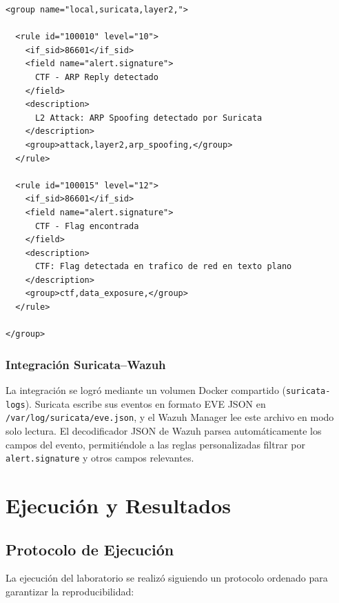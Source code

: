 \documentclass[12pt, a4paper]{article}
\begin{document}
\begin{lstlisting}[style=rulestyle, caption={Ejemplo de regla personalizada de Wazuh}]
<group name="local,suricata,layer2,">

  <rule id="100010" level="10">
    <if_sid>86601</if_sid>
    <field name="alert.signature">
      CTF - ARP Reply detectado
    </field>
    <description>
      L2 Attack: ARP Spoofing detectado por Suricata
    </description>
    <group>attack,layer2,arp_spoofing,</group>
  </rule>

  <rule id="100015" level="12">
    <if_sid>86601</if_sid>
    <field name="alert.signature">
      CTF - Flag encontrada
    </field>
    <description>
      CTF: Flag detectada en trafico de red en texto plano
    </description>
    <group>ctf,data_exposure,</group>
  </rule>

</group>
\end{lstlisting}

\subsubsection{Integraci\'on Suricata--Wazuh}

La integraci\'on se logr\'o mediante un volumen Docker compartido (\texttt{suricata-logs}). Suricata escribe sus eventos en formato EVE JSON en \texttt{/var/log/suricata/eve.json}, y el Wazuh Manager lee este archivo en modo solo lectura. El decodificador JSON de Wazuh parsea autom\'aticamente los campos del evento, permiti\'endole a las reglas personalizadas filtrar por \texttt{alert.signature} y otros campos relevantes.

\newpage

\section{Ejecuci\'on y Resultados}

\subsection{Protocolo de Ejecuci\'on}

La ejecuci\'on del laboratorio se realiz\'o siguiendo un protocolo ordenado para garantizar la reproducibilidad:
\end{document}
